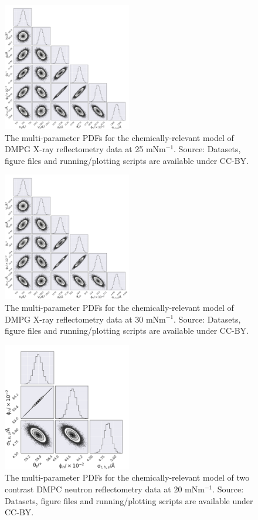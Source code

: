 \documentclass[11pt,a4paper]{article}
\begin{document}
\begin{figure}[h]
	\centering
	\includegraphics[width=0.50\textwidth]{figures/dmpg4_all_corner}
	\caption{The multi-parameter PDFs for the chemically-relevant model of DMPG X-ray reflectometry data at 25 mNm$^{-1}$. Source: Datasets, figure files and running/plotting scripts are available under CC-BY.\cite{mccluskey_2018}}
	\label{fig:dmpg4}
\end{figure}
\begin{figure}
	\centering
	\includegraphics[width=0.50\textwidth]{figures/dmpg5_all_corner}
	\caption{The multi-parameter PDFs for the chemically-relevant model of DMPG X-ray reflectometry data at 30 mNm$^{-1}$. Source: Datasets, figure files and running/plotting scripts are available under CC-BY.\cite{mccluskey_2018}}
	\label{fig:dmpg5}
\end{figure}
\begin{figure}[h]
	\centering
	\includegraphics[width=0.50\textwidth]{figures/dmpc20_neutron_corner}
	\caption{The multi-parameter PDFs for the chemically-relevant model of two contrast DMPC neutron reflectometry data at 20 mNm$^{-1}$. Source: Datasets, figure files and running/plotting scripts are available under CC-BY.\cite{mccluskey_2018}}
	\label{fig:dmpcn1}
\end{figure}
\end{document}
